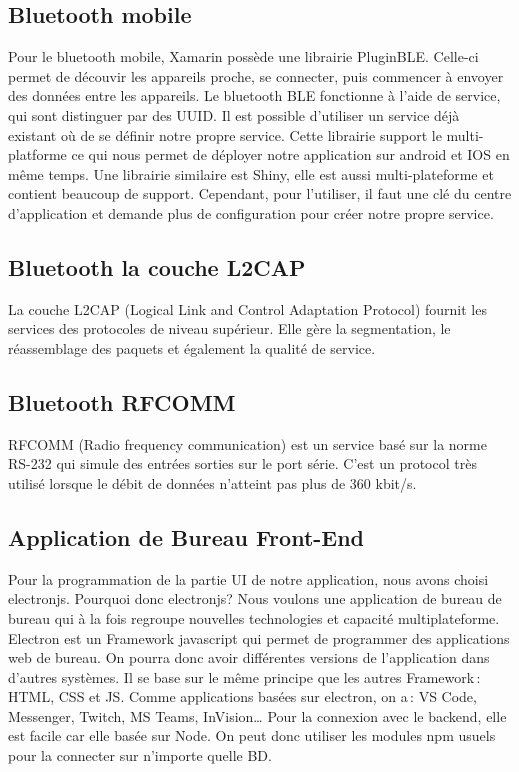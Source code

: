 \documentclass[12pt,fleqn]{article}
\begin{document}
\subsection{Bluetooth mobile}
Pour le bluetooth mobile, Xamarin possède une librairie PluginBLE\cite{PluginBLE}. Celle-ci permet de découvir les appareils proche, se connecter, puis commencer à envoyer des données entre les appareils. Le bluetooth BLE fonctionne à l'aide de service, qui sont distinguer par des UUID. Il est possible d'utiliser un service déjà existant où de se définir notre propre service. Cette librairie support le multi-platforme ce qui nous permet de déployer notre application sur android et IOS en même temps. Une librairie similaire est Shiny\cite{Shiny}, elle est aussi multi-plateforme et contient beaucoup de support. Cependant, pour l'utiliser, il faut une clé du centre d'application et demande plus de configuration pour créer notre propre service. 

\subsection{Bluetooth la couche L2CAP}
La couche L2CAP (Logical Link and Control  Adaptation Protocol) fournit les services des protocoles de niveau supérieur. Elle gère la segmentation, le réassemblage des paquets et également la qualité de service.

\subsection{Bluetooth RFCOMM}
RFCOMM (Radio frequency communication) est un service basé sur la norme RS-232 qui simule des entrées sorties sur le port série. C'est un protocol très utilisé lorsque le débit de données n'atteint pas plus de 360 kbit/s. 


\subsection{Application de Bureau Front-End}	
Pour la programmation de la partie UI de notre application, nous avons choisi electronjs. Pourquoi donc electronjs? 	
Nous voulons une application de bureau de bureau qui à la fois regroupe nouvelles technologies et capacité multiplateforme. Electron est un Framework javascript qui permet de programmer des applications web de bureau. On pourra donc avoir différentes versions de l’application dans d’autres systèmes. Il se base sur le même principe que les autres Framework : HTML, CSS et JS. Comme applications basées sur electron, on a : VS Code, Messenger, Twitch, MS Teams, InVision… 	
Pour la connexion avec le backend, elle est facile car elle basée sur Node. On peut donc utiliser les modules npm usuels pour la connecter sur n’importe quelle BD. 
\end{document}

